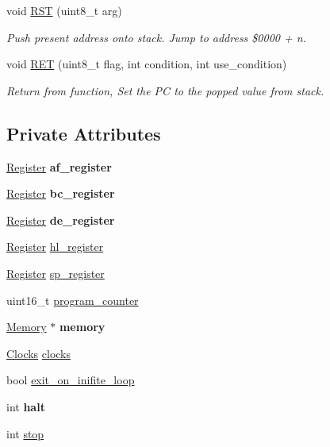 \begin{DoxyCompactItemize}
void \mbox{\hyperlink{classCPU_a50f5edddbc08725e4377c8aaa147b558}{R\+ST}} (uint8\+\_\+t arg)
\begin{DoxyCompactList}\small\item\em Push present address onto stack. Jump to address \$0000 + n. \end{DoxyCompactList}\item 
void \mbox{\hyperlink{classCPU_a0b842b14ba5be5f72602193c56538b65}{R\+ET}} (uint8\+\_\+t flag, int condition, int use\+\_\+condition)
\begin{DoxyCompactList}\small\item\em Return from function, Set the PC to the popped value from stack. \end{DoxyCompactList}\end{DoxyCompactItemize}
\subsection*{Private Attributes}
\begin{DoxyCompactItemize}
\item 
\mbox{\label{classCPU_aa3352eefec97a9b3faf1e13abc2ca473}} 
\mbox{\hyperlink{unionRegister}{Register}} {\bfseries af\+\_\+register}
\item 
\mbox{\label{classCPU_ab1b2e2e6d3b8b64c75daba3837169e4f}} 
\mbox{\hyperlink{unionRegister}{Register}} {\bfseries bc\+\_\+register}
\item 
\mbox{\label{classCPU_a079174567e55982d723a12cb756a098f}} 
\mbox{\hyperlink{unionRegister}{Register}} {\bfseries de\+\_\+register}
\item 
\mbox{\hyperlink{unionRegister}{Register}} \mbox{\hyperlink{classCPU_a9fff80db27b783910f160c52ae8f4baf}{hl\+\_\+register}}
\item 
\mbox{\hyperlink{unionRegister}{Register}} \mbox{\hyperlink{classCPU_aa3b4070f5a781ad6131bc9912ef128a4}{sp\+\_\+register}}
\item 
uint16\+\_\+t \mbox{\hyperlink{classCPU_a4714cc8907d24f008156b3c9ec20cd96}{program\+\_\+counter}}
\item 
\mbox{\label{classCPU_ac8a187671f7e65e6db8b18742141fa37}} 
\mbox{\hyperlink{classMemory}{Memory}} $\ast$ {\bfseries memory}
\item 
\mbox{\hyperlink{structClocks}{Clocks}} \mbox{\hyperlink{classCPU_a03bd87cbd5f51d81adb540a6f478de4a}{clocks}}
\item 
bool \mbox{\hyperlink{classCPU_a16be551906c5f6c501348ec25e57d7b4}{exit\+\_\+on\+\_\+inifite\+\_\+loop}}
\item 
\mbox{\label{classCPU_ab3fc29b24b2df69ebdc7a611606b566b}} 
int {\bfseries halt}
\item 
int \mbox{\hyperlink{classCPU_a7dc961769c87974ae5384a70019addba}{stop}}
\end{DoxyCompactItemize}


